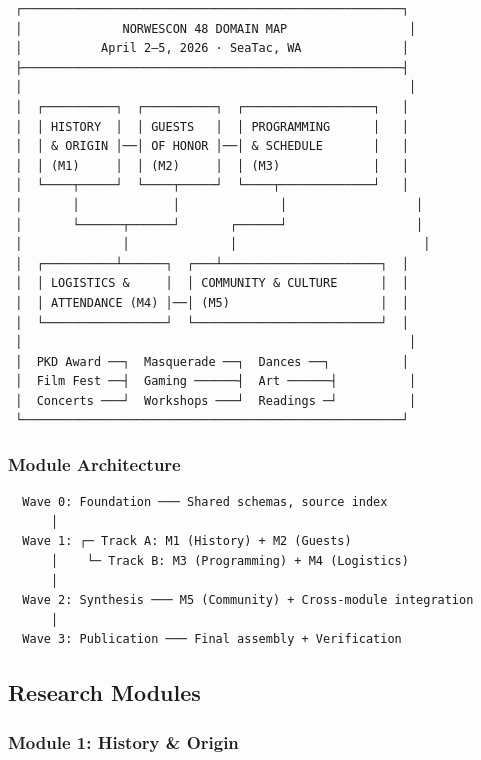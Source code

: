 \documentclass[11pt,letterpaper]{article}
\begin{document}
\begin{asciibox}
\begin{verbatim}
 ┌─────────────────────────────────────────────────────┐
 │              NORWESCON 48 DOMAIN MAP                 │
 │           April 2–5, 2026 · SeaTac, WA              │
 ├─────────────────────────────────────────────────────┤
 │                                                      │
 │  ┌──────────┐  ┌──────────┐  ┌──────────────────┐   │
 │  │ HISTORY  │  │ GUESTS   │  │ PROGRAMMING      │   │
 │  │ & ORIGIN │──│ OF HONOR │──│ & SCHEDULE       │   │
 │  │ (M1)     │  │ (M2)     │  │ (M3)             │   │
 │  └────┬─────┘  └────┬─────┘  └────┬─────────────┘   │
 │       │             │              │                  │
 │       └──────┬──────┘       ┌──────┘                  │
 │              │              │                          │
 │  ┌──────────┴──────┐  ┌───┴──────────────────────┐  │
 │  │ LOGISTICS &     │  │ COMMUNITY & CULTURE      │  │
 │  │ ATTENDANCE (M4) │──│ (M5)                     │  │
 │  └─────────────────┘  └──────────────────────────┘  │
 │                                                      │
 │  PKD Award ──┐  Masquerade ──┐  Dances ──┐          │
 │  Film Fest ──┤  Gaming ──────┤  Art ──────┤          │
 │  Concerts ───┘  Workshops ───┘  Readings ─┘          │
 └─────────────────────────────────────────────────────┘
\end{verbatim}
\end{asciibox}

\subsubsection{Module Architecture}

\begin{asciibox}
\begin{verbatim}
  Wave 0: Foundation ─── Shared schemas, source index
      │
  Wave 1: ┌─ Track A: M1 (History) + M2 (Guests)
      │    └─ Track B: M3 (Programming) + M4 (Logistics)
      │
  Wave 2: Synthesis ─── M5 (Community) + Cross-module integration
      │
  Wave 3: Publication ─── Final assembly + Verification
\end{verbatim}
\end{asciibox}

\subsection{Research Modules}

\subsubsection{Module 1: History \& Origin}
\end{document}
